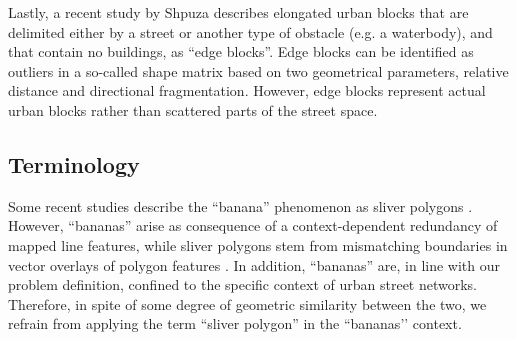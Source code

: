 Lastly, a recent study by Shpuza \cite{shpuza_shape_2022} describes elongated urban blocks that are delimited either by a street or another type of obstacle (e.g. a waterbody), and that contain no buildings, as ``edge blocks''. Edge blocks can be identified as outliers in a so-called shape matrix based on two geometrical parameters, relative distance and directional fragmentation. However, edge blocks represent actual urban blocks rather than scattered parts of the street space.

\subsection*{Terminology}

Some recent studies describe the ``banana'' phenomenon as sliver polygons \cite{grippa_mapping_2018, sanzana_decomposition_2018, ludwig_mapping_2021}. However, ``bananas'' arise as consequence of a context-dependent redundancy of mapped line features, while sliver polygons stem from mismatching boundaries in vector overlays of polygon features \cite{goodchild_statistical_1978, fischer_using_1993, delafontaine_assessment_2009}. In addition, ``bananas'' are, in line with our problem definition, confined to the specific context of urban street networks. Therefore, in spite of some degree of geometric similarity between the two, we refrain from applying the term ``sliver polygon'' in the ``bananas’’ context.
